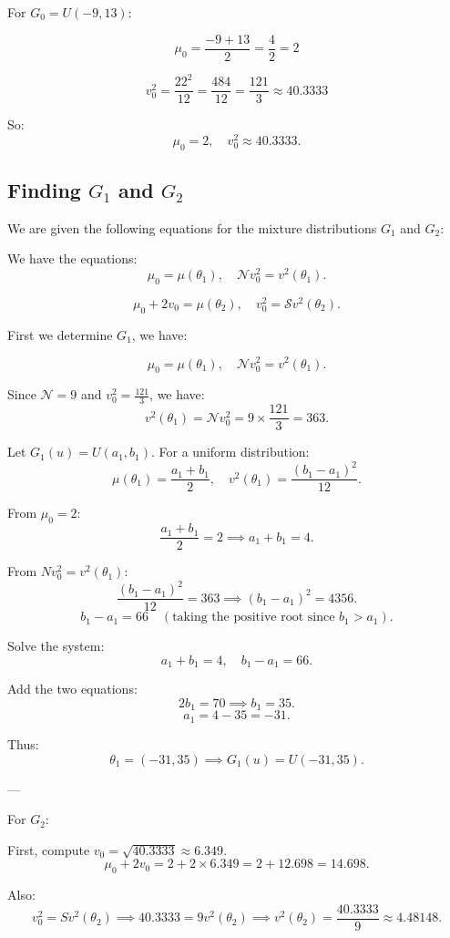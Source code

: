 \documentclass{article}
\begin{document}
For \(G_0 = U(-9, 13)\):

\[
\mu_0 = \frac{-9 + 13}{2} = \frac{4}{2} = 2
\]

\[
v_0^2 = \frac{22^2}{12} = \frac{484}{12} = \frac{121}{3} \approx 40.3333
\]

So:
\[
\mu_0 = 2, \quad v_0^2 \approx 40.3333.
\]

\subsection{Finding \(G_1\) and \(G_2\)}

We are given the following equations for the mixture distributions \(G_1\) and \(G_2\):

We have the equations:
\[
\mu_0 = \mu(\theta_1), \quad \mathcal{N} v_0^2 = v^2(\theta_1).
\]

\[
\mu_0 + 2v_0 = \mu(\theta_2), \quad v_0^2 = \mathcal{S} v^2(\theta_2).
\]

First we determine \(G_1\), we have:

\[
\mu_0 = \mu(\theta_1), \quad \mathcal{N} v_0^2 = v^2(\theta_1).
\]

Since \(\mathcal{N} = 9\) and \(v_0^2 = \frac{121}{3} \), we have:
\[
v^2(\theta_1) = \mathcal{N} v_0^2 = 9 \times \frac{121}{3} = 363.
\]

Let \(G_1(u) = U(a_1,b_1)\). For a uniform distribution:
\[
\mu(\theta_1) = \frac{a_1 + b_1}{2}, \quad v^2(\theta_1) = \frac{(b_1 - a_1)^2}{12}.
\]

From \(\mu_0 = 2\):
\[
\frac{a_1 + b_1}{2} = 2 \implies a_1 + b_1 = 4.
\]

From \(N v_0^2 = v^2(\theta_1)\):
\[
\frac{(b_1 - a_1)^2}{12} = 363 \implies (b_1 - a_1)^2 = 4356.
\]
\[
b_1 - a_1 = 66 \quad (\text{taking the positive root since } b_1 > a_1).
\]

Solve the system:
\[
a_1 + b_1 = 4, \quad b_1 - a_1 = 66.
\]

Add the two equations:
\[
2b_1 = 70 \implies b_1 = 35.
\]
\[
a_1 = 4 - 35 = -31.
\]

Thus:
\[
\theta_1 = (-31, 35) \implies G_1(u) = U(-31,35).
\]

---

For \(G_2\):

First, compute \(v_0 = \sqrt{40.3333} \approx 6.349.\)
\[
\mu_0 + 2v_0 = 2 + 2 \times 6.349 = 2 + 12.698 = 14.698.
\]

Also:
\[
v_0^2 = S v^2(\theta_2) \implies 40.3333 = 9 v^2(\theta_2) \implies v^2(\theta_2) = \frac{40.3333}{9} \approx 4.48148.
\]
\end{document}
